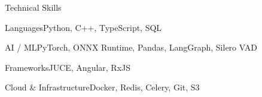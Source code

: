 \documentclass[
	11pt
]{../../../template}
\begin{document}
	\begin{rSection}{T}{echnical Skills}
		\begin{rSet}{Languages}{Python, C++, TypeScript, SQL}
		\end{rSet}
		\begin{rSet}{AI / ML}{PyTorch, ONNX Runtime, Pandas, LangGraph, Silero VAD}
		\end{rSet}
		\begin{rSet}{Frameworks}{JUCE, Angular, RxJS}
		\end{rSet}
		\begin{rSet}{Cloud \& Infrastructure}{Docker, Redis, Celery, Git, S3}
		\end{rSet}
	\end{rSection}
\end{document}
